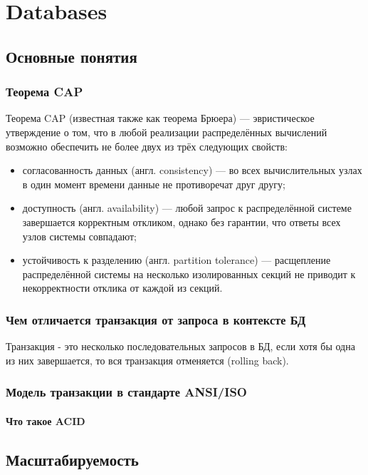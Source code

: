 \part{Databases}

\chapter{Основные понятия}

\section{Теорема CAP}

Теорема CAP (известная также как теорема Брюера) — эвристическое утверждение о том, что в любой реализации распределённых вычислений возможно обеспечить не более двух из трёх следующих свойств:
\begin{itemize}

\item согласованность данных (англ. consistency) — во всех вычислительных узлах в один момент времени данные не противоречат друг другу;
\item доступность (англ. availability) — любой запрос к распределённой системе завершается корректным откликом, однако без гарантии, что ответы всех узлов системы совпадают;
\item устойчивость к разделению (англ. partition tolerance) — расщепление распределённой системы на несколько изолированных секций не приводит к некорректности отклика от каждой из секций.

\end{itemize}

\section{Чем отличается транзакция от запроса в контексте БД}
Транзакция - это несколько последовательных запросов в БД, если хотя бы одна из них завершается, то вся транзакция отменяется (rolling back).

\section{Модель транзакции в стандарте ANSI/ISO}
\subsection{Что такое ACID}


\chapter{Масштабируемость}

